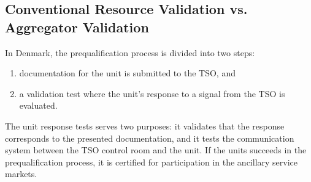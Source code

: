 \subsection{Conventional Resource Validation vs. Aggregator Validation}\label{subsec:backgroundvalidation}
In Denmark, the prequalification process is divided into two steps:
\begin{enumerate}
	\item documentation for the unit is submitted to the TSO, and
	\item a validation test where the unit's response to a signal from the TSO is evaluated.
\end{enumerate}

The unit response tests serves two purposes: it validates that the response corresponds to the presented documentation, and it tests the communication system between the TSO control room and the unit. If the units succeeds in the prequalification process, it is certified for participation in the ancillary service markets.

